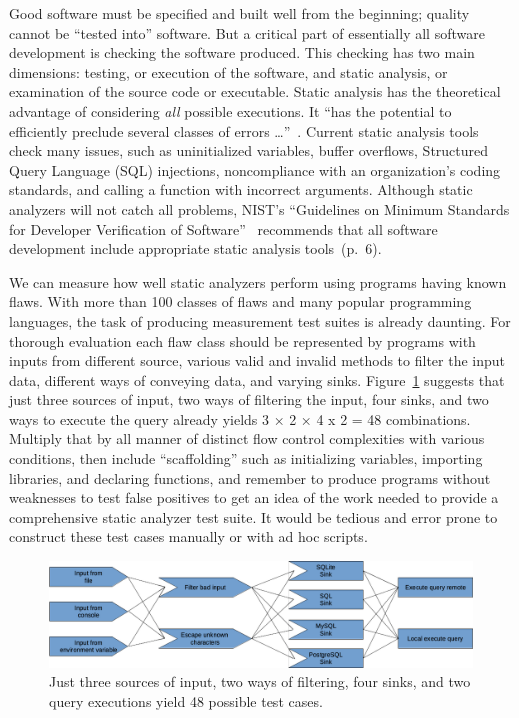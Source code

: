 Good software must be specified and built well from the beginning; quality cannot be
``tested into'' software.  But a critical part of essentially all software
development is checking the software produced.  This checking has two main
dimensions: testing, or execution of the software, and static analysis, or
examination of the source code or executable.  Static analysis has the theoretical
advantage of considering \emph{all} possible executions.  It ``has the potential to
efficiently preclude several classes of errors \ldots''~\cite[p.~7]{DRSV2016}.
Current static analysis tools check many issues, such as uninitialized variables,
buffer overflows, Structured Query Language (SQL) injections,
noncompliance with an organization’s coding
standards, and calling a function with incorrect arguments.  Although static
analyzers will not catch all problems, NIST's ``Guidelines on Minimum Standards
for Developer Verification of Software''~\cite{MinGuidelines2021} recommends
that all software development include appropriate static analysis tools~(p.~6).

We can measure how well static analyzers perform using programs having known
flaws.  With more than 100 classes of flaws and many popular programming
languages, the task of producing measurement test suites is already daunting.
For thorough evaluation each flaw class should be represented by programs with
inputs from different source, various valid and invalid methods to filter the
input data, different ways of conveying data, and varying sinks.
Figure~\ref{fig:cartesian product} suggests that just three sources of input,
two ways of filtering the input, four sinks, and two ways to execute the query
already yields 3 × 2 × 4 x 2 = 48
combinations.  Multiply that by all manner of distinct flow control
complexities with various conditions, then include ``scaffolding'' such as
initializing variables, importing libraries, and declaring functions, and remember
to produce programs without weaknesses to test false positives to get an
idea of the work needed to provide a comprehensive static analyzer test suite.
It would be tedious and error prone to construct these test cases
manually or with ad hoc scripts.

\begin{figure}[tbp]
  \includegraphics[width=1\linewidth]{fig_cartesian_product.png}
  \caption{Just three sources of input, two ways of filtering, four sinks, and
    two query executions yield 48 possible test cases.}
  \label{fig:cartesian product}
\end{figure}

